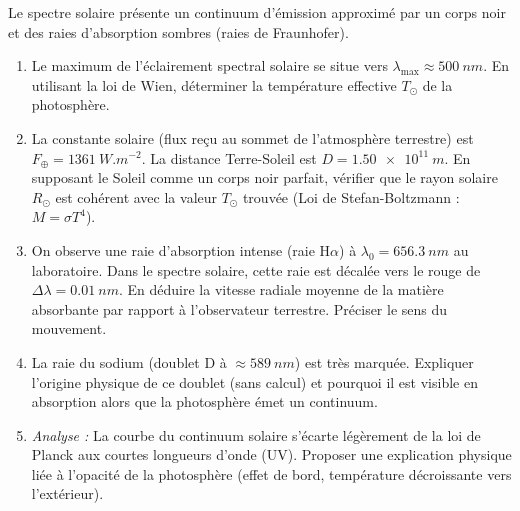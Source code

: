 \documentclass[11pt]{article}
\begin{document}
\begin{exercice}
Le spectre solaire présente un continuum d'émission approximé par un corps noir et des raies d'absorption sombres (raies de Fraunhofer).
\begin{enumerate}
    \item Le maximum de l'éclairement spectral solaire se situe vers $\lambda_{\text{max}} \approx \SI{500}{nm}$. En utilisant la loi de Wien, déterminer la température effective $T_{\odot}$ de la photosphère.
    \item La constante solaire (flux reçu au sommet de l'atmosphère terrestre) est $F_{\oplus} = \SI{1361}{W.m^{-2}}$. La distance Terre-Soleil est $D = \SI{1,50e11}{m}$. En supposant le Soleil comme un corps noir parfait, vérifier que le rayon solaire $R_{\odot}$ est cohérent avec la valeur $T_{\odot}$ trouvée (Loi de Stefan-Boltzmann : $M = \sigma T^4$).
    \item On observe une raie d'absorption intense (raie H$\alpha$) à $\lambda_0 = \SI{656,3}{nm}$ au laboratoire. Dans le spectre solaire, cette raie est décalée vers le rouge de $\Delta \lambda = \SI{0,01}{nm}$. En déduire la vitesse radiale moyenne de la matière absorbante par rapport à l'observateur terrestre. Préciser le sens du mouvement.
    \item La raie du sodium (doublet D à $\approx \SI{589}{nm}$) est très marquée. Expliquer l'origine physique de ce doublet (sans calcul) et pourquoi il est visible en absorption alors que la photosphère émet un continuum.
    \item \textit{Analyse :} La courbe du continuum solaire s'écarte légèrement de la loi de Planck aux courtes longueurs d'onde (UV). Proposer une explication physique liée à l'opacité de la photosphère (effet de bord, température décroissante vers l'extérieur).
\end{enumerate}
\end{exercice}
\end{document}
